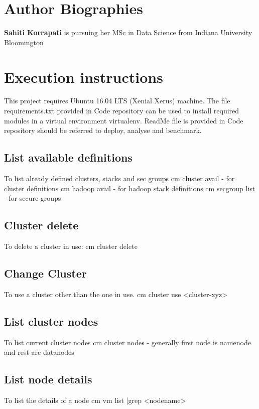 \documentclass[9pt,twocolumn,twoside]{../../styles/osajnl}
\begin{document}
\section*{Author Biographies}
\begingroup
\setlength\intextsep{0pt}
\begin{minipage}[t][3.2cm][t]{1.0\columnwidth} %
  \noindent
  {\bfseries Sahiti Korrapati} is pursuing her MSc in Data Science from
  Indiana University Bloomington
\end{minipage}
\endgroup
\newpage
\appendix
\section{Execution instructions}
This project requires Ubuntu 16.04 LTS (Xenial Xerus) machine. The file requirements.txt provided in Code repository can be used to install required modules in a virtual environment virtualenv. ReadMe file is provided in Code repository should be referred to deploy, analyse and benchmark.
\subsection{List available definitions} To list already defined clusters, stacks and sec groups
\newline cm cluster avail - for cluster definitions
\newline cm hadoop avail - for hadoop stack definitions
\newline cm secgroup list - for secure groups

\subsection{Cluster delete} To delete a cluster in use:
\newline cm cluster delete
\subsection{Change Cluster} To use a cluster other than the one in use.
\newline cm cluster use <cluster-xyz>
\subsection{List cluster nodes} To list current cluster nodes
\newline cm cluster nodes - generally first node is namenode and rest are datanodes
\subsection{List node details} To list the details of a node
\newline cm vm list |grep <nodename>
\end{document}
